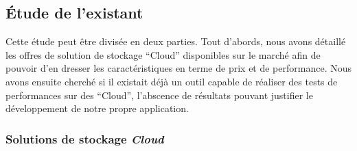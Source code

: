 \documentclass[10pt]{article}
\begin{document}
\subsection{Étude de l'existant}

Cette étude peut être divisée en deux parties. Tout d’abords, nous
avons détaillé les offres de solution de stockage “Cloud” disponibles
sur le marché afin de pouvoir d'en dresser les caractéristiques en terme de prix et de performance. 
Nous avons ensuite cherché si il existait déjà un outil capable de réaliser des tests de performances
sur des “Cloud”, l'abscence de résultats pouvant justifier  le développement de notre propre
application.

\newpage

\subsubsection{Solutions de stockage \textit{Cloud}}
\end{document}
